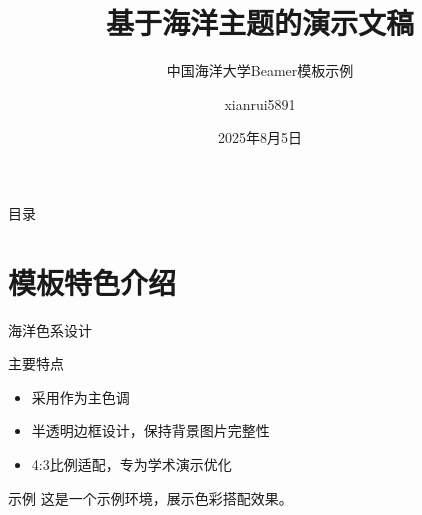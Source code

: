 \documentclass{beamer}
\title{基于海洋主题的演示文稿}
\subtitle{中国海洋大学Beamer模板示例}
\author{xianrui5891}
\institute{中国海洋大学崇本学院}
\date{2025年8月5日}
\begin{document}
\maketitle

\tocbackground
\begin{frame}{目录}
    \begin{multicols}{2}
        \small
        \tableofcontents[sectionstyle=show/shaded,subsectionstyle=show/shaded/hide,subsubsectionstyle=show/shaded/hide]
    \end{multicols}
\end{frame}
\contentbackground

\section{模板特色介绍}

\begin{frame}{海洋色系设计}
    \begin{block}{主要特点}
        \begin{itemize}
            \item 采用作为主色调
            \item 半透明边框设计，保持背景图片完整性
            \item 4:3比例适配，专为学术演示优化
        \end{itemize}
    \end{block}
    
    \begin{exampleblock}{示例}
        这是一个示例环境，展示色彩搭配效果。
    \end{exampleblock}
\end{frame}
\end{document}
